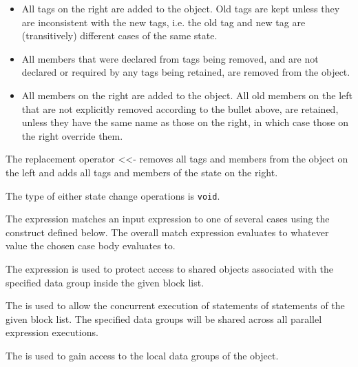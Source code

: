 \begin{itemize}

\item
All tags on the right are added to the object.  Old tags are kept
unless they are inconsistent with the new tags, i.e. the old tag and
new tag are (transitively) different cases of the same state.

\item
All members that were declared from tags being removed, and are not
declared or required by any tags being retained, are removed from
the object.

\item
All members on the right are added to the object.  All old members on
the left that are not explicitly removed according to the bullet
above, are retained, unless they have the same name as those on the
right, in which case those on the right override them. 

\end{itemize}

The replacement operator <<- removes all tags and members from the object on the left and adds all tags and members of the state on the right.   

The type of either state change operations is \texttt{void}.

The  expression matches an input expression to one of
several cases using the  construct defined below.
The overall match expression evaluates to whatever value the
chosen case body evaluates to.

The  expression is used to protect access to shared
objects associated with the specified data group inside the given
block list.

The  is used to allow the concurrent execution of
statements of statements of the given block list. The specified data
groups will be shared across all parallel expression executions.

The  is used to gain access to the local data
groups of the object.

\begin{quote}


 {}  

 {} 


 {}





 {} 

\end{quote}

